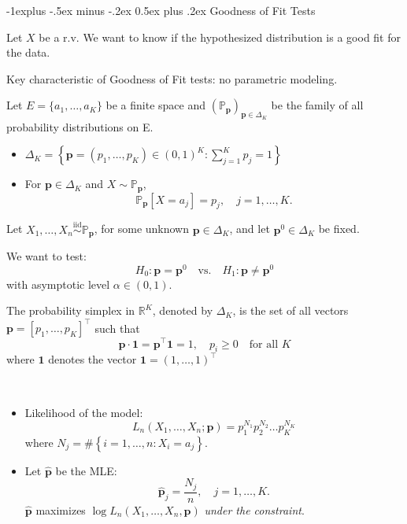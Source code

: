 \documentclass[a4paper, 10pt,landscape]{article}
\makeatletter
\renewcommand{\subsection}{\@startsection{subsection}{2}{0mm}%
                                {-1explus -.5ex minus -.2ex}%
                                {0.5ex plus .2ex}%
                                {\normalfont\normalsize\bfseries}}
\makeatother
\begin{document}
\begin{multicols*}{3}
\subsection{Goodness of Fit Tests}

\begin{description}
	\item Let $X$ be a r.v. We want to know if the hypothesized distribution is a good fit for the data.
	\item Key characteristic of Goodness of Fit tests: no parametric modeling.
	\item[Discrete distribution] Let $E=\{a_1,\dots,a_K\}$ be a finite space and $\left(\mathbb{P}_\mathbf{p}\right)_{\mathbf{p}\in\Delta_K}$ be the family of all probability distributions on E.
	\begin{itemize}
		\item $\Delta_K=\left\{\mathbf{p}=\left(p_1,\dots,p_K\right)\in(0,1)^K:{\displaystyle\sum_{j=1}^{K}}p_j=1\right\}$
		\item For $\mathbf{p}\in\Delta_K$ and $X\sim\mathbb{P}_\mathbf{p}$, $$\mathbb{P}_\mathbf{p}\left[X=a_j\right]=p_j,\quad j=1,\dots,K.$$
	\end{itemize}
	\item Let $X_1,\dots,X_n\stackrel{\text{iid}}{\sim}\mathbb{P}_\mathbf{p}$, for some unknown $\mathbf{p}\in\Delta_K$, and let $\mathbf{p}^0\in\Delta_K$ be fixed.
	\item We want to test:
	$$H_0:\mathbf{p}=\mathbf{p}^0\quad\text{vs.}\quad H_1:\mathbf{p}\neq\mathbf{p}^0$$
	with asymptotic level $\alpha\in(0,1)$.
	\item[The Probability Simplex in $K$ Dimensions] The probability simplex in $\mathbb{R}^K$, denoted by $\Delta_K$, is the set of all vectors $\mathbf{p}=\left[p_1,\dots,p_K\right]^\intercal$ such that $$\mathbf{p}\cdot\mathbf{1}=\mathbf{p}^\intercal\mathbf{1}=1,\quad p_i\geq0\quad\text{for all $K$}$$
	where $\mathbf{1}$ denotes the vector $\mathbf{1}=\left(1,\dots,1\right)^\intercal$
	\item[Categorical Likelihood] ~
	\begin{itemize}
		\item Likelihood of the model:
		$$L_n\left(X_1,\dots,X_n;\mathbf{p}\right)=p_1^{N_1}p_2^{N_2}\dots p_K^{N_K}$$
		where $N_j=\#\left\{i=1,\dots,n: X_i=a_j\right\}.$
		\item Let $\widehat{\mathbf{p}}$ be the MLE:
		$$\widehat{\mathbf{p}}_j=\dfrac{N_j}{n},\quad j=1,\dots,K.$$
		$\widehat{\mathbf{p}}$ maximizes $\log L_n\left(X_1,\dots,X_n,\mathbf{p}\right)$ {\it under the constraint}.

\end{itemize}
\end{description}
\end{multicols*}
\end{document}
